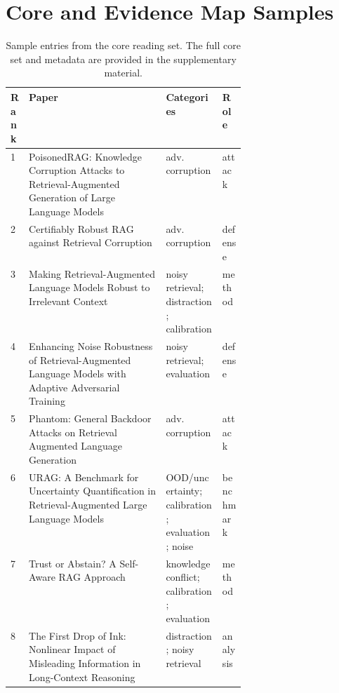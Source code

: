 \documentclass[11pt]{article}
\begin{document}
\section{Core and Evidence Map Samples}
\begin{table}[t]
\centering
\scriptsize
\begin{tabularx}{\linewidth}{p{0.05\linewidth}X p{0.24\linewidth} p{0.10\linewidth}}
\toprule
Rank & Paper & Categories & Role \\
\midrule
1 & PoisonedRAG: Knowledge Corruption Attacks to Retrieval-Augmented Generation of Large Language Models & adv. corruption & attack \\
2 & Certifiably Robust RAG against Retrieval Corruption & adv. corruption & defense \\
3 & Making Retrieval-Augmented Language Models Robust to Irrelevant Context & noisy retrieval; distraction; calibration & method \\
4 & Enhancing Noise Robustness of Retrieval-Augmented Language Models with Adaptive Adversarial Training & noisy retrieval; evaluation & defense \\
5 & Phantom: General Backdoor Attacks on Retrieval Augmented Language Generation & adv. corruption & attack \\
6 & URAG: A Benchmark for Uncertainty Quantification in Retrieval-Augmented Large Language Models & OOD/uncertainty; calibration; evaluation; noise & benchmark \\
7 & Trust or Abstain? A Self-Aware RAG Approach & knowledge conflict; calibration; evaluation & method \\
8 & The First Drop of Ink: Nonlinear Impact of Misleading Information in Long-Context Reasoning & distraction; noisy retrieval & analysis \\
\bottomrule
\end{tabularx}
\caption{Sample entries from the core reading set. The full core set and metadata are provided in the supplementary material.}
\label{tab:core-sample}
\end{table}

\end{document}
